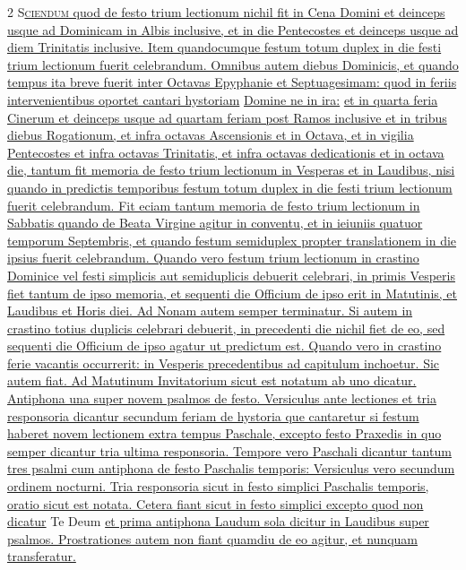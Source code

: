 \begin{multicols*}{2}
{\color{Red} }
\lettrine[lines=2]{\zallmancaps \color{Red} S}{}\ul{\textsc{ciendum} quod de festo trium lectionum nichil fit in Cena Domini et deinceps usque ad Dominicam in Albis inclusive, et in die Pentecostes et deinceps usque ad diem Trinitatis inclusive.
Item quandocumque festum totum duplex in die festi trium lectionum fuerit celebrandum.
Omnibus autem diebus Dominicis, et quando tempus ita breve fuerit inter Octavas Epyphanie et Septuagesimam: quod in feriis intervenientibus oportet cantari hystoriam} \hyperlink{domine-ne-in-ira}{Domine ne in ira:} \ul{et in quarta feria Cinerum et deinceps usque ad quartam feriam post Ramos inclusive et in tribus diebus Rogationum, et infra octavas Ascensionis et in Octava, et in vigilia Pentecostes et infra octavas Trinitatis, et infra octavas dedicationis et in octava die, tantum fit memoria de festo trium lectionum in Vesperas et in Laudibus, nisi quando in predictis temporibus festum totum duplex in die festi trium lectionum fuerit celebrandum.
Fit eciam tantum memoria de festo trium lectionum in Sabbatis quando de Beata Virgine agitur in conventu, et in ieiuniis quatuor temporum Septembris, et quando festum semiduplex propter translationem in die ipsius fuerit celebrandum.
Quando vero festum trium lectionum in crastino Dominice vel festi simplicis aut semiduplicis debuerit celebrari, in primis Vesperis fiet tantum de ipso memoria, et sequenti die Officium de ipso erit in Matutinis, et Laudibus et Horis diei. Ad Nonam autem semper terminatur.
Si autem in crastino totius duplicis celebrari debuerit, in precedenti die nichil fiet de eo, sed sequenti die Officium de ipso agatur ut predictum est.
Quando vero in crastino ferie vacantis occurrerit: in Vesperis precedentibus ad capitulum inchoetur. Sic autem fiat. Ad Matutinum Invitatorium sicut est notatum ab uno dicatur. Antiphona una super novem psalmos de festo. Versiculus ante lectiones et tria responsoria dicantur secundum feriam de hystoria que cantaretur si festum haberet novem lectionem extra tempus Paschale, excepto festo Praxedis in quo semper dicantur tria ultima responsoria. Tempore vero Paschali dicantur tantum tres psalmi cum antiphona de festo Paschalis temporis: Versiculus vero secundum ordinem nocturni. Tria responsoria sicut in festo simplici Paschalis temporis, oratio sicut est notata. Cetera fiant sicut in festo simplici excepto quod non dicatur} Te Deum \ul{et prima antiphona Laudum sola dicitur in Laudibus super psalmos. Prostrationes autem non fiant quamdiu de eo agitur, et nunquam transferatur.}


\end{multicols*}
